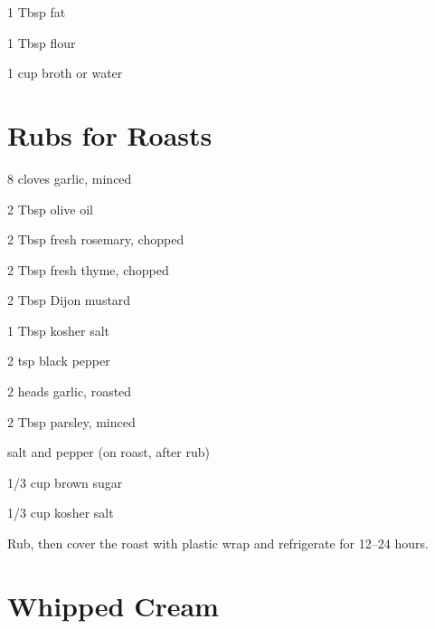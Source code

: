 \documentclass[oneside]{book}  %
\def\thisrecipe{}  %
\newcommand{\recipe}[1]{\section{#1}\def\thisrecipe{: #1}} %
\newcommand{\itemNL}{\item[] \hspace{-\labelsep}}  %
\begin{document}
\begin{twocols}
  \begin{ingredients}[title=Gravy]
    \item[1 Tbsp] fat
    \item[1 Tbsp] flour
    \item[1 cup] broth or water
  \end{ingredients}

\end{twocols}
\recipe{Rubs for Roasts} \label{recipe:rubs_for_roasts} %

\begin{twocols}
  \begin{ingredients}[title=Garlic Rosemary Thyme Dijon]
    \item[8] cloves garlic, minced
    \item[2 Tbsp] olive oil
    \item[2 Tbsp] fresh rosemary, chopped
    \item[2 Tbsp] fresh thyme, chopped
    \item[2 Tbsp] Dijon mustard
    \item[1 Tbsp] kosher salt
    \item[2 tsp]  black pepper
  \end{ingredients}

  \columnbreak

  \begin{ingredients}[title=Roasted Garlic Parsley]
    \item[2 heads] garlic, roasted
    \item[2 Tbsp] parsley, minced
    \itemNL salt and pepper (on roast, after rub)
  \end{ingredients}

  \begin{ingredients}[title=Salt and Sugar]
    \item[1/3 cup] brown sugar
    \item[1/3 cup] kosher salt
  \end{ingredients}
  \vspace{-0.75em} Rub, then cover the roast with plastic wrap and refrigerate
  for 12--24 hours.

\end{twocols}
\recipe{Whipped Cream} \label{recipe:whipped_cream} %
\end{document}
